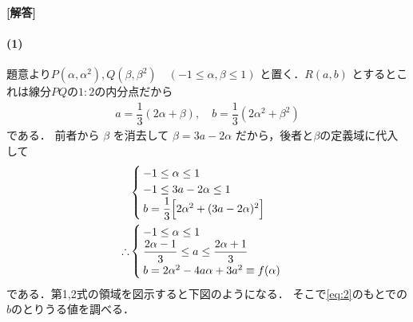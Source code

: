 \documentclass[../../main.tex]{subfiles}
\begin{document}
\begin{oframed}
  
\end{oframed}

{\bf [解答]}
\paragraph{(1)}

題意より$P(\alpha, \alpha^2), Q(\beta, \beta^2) \quad (-1 \le \alpha, \beta \le 1)$ と置く．$R(a, b)$ とするとこれは線分$PQ$の$1:2$の内分点だから
\begin{align}
  a = \dfrac{1}{3}(2\alpha + \beta), \quad b = \dfrac{1}{3}(2\alpha^2 + \beta^2) \label{eq:1}
\end{align}
である．
前者から $\beta$ を消去して $\beta = 3a - 2\alpha$ だから，後者と$\beta$の定義域に代入して
\begin{align}
  &
  \begin{cases}
    -1 \le \alpha \le 1 \\
    -1 \le 3a - 2\alpha \le 1 \\
    b = \dfrac{1}{3} \Bigl[ 2\alpha^2 + (3a - 2\alpha)^2 \Bigr]
  \end{cases} \\
  \therefore
  &
  \begin{cases}
    -1 \le \alpha \le 1 \\
    \dfrac{2\alpha-1}{3} \le a \le \dfrac{2\alpha + 1}{3} \\
    b = 2\alpha^2 - 4a\alpha + 3a^2 \equiv f(\alpha)
  \end{cases} \label{eq:2}
\end{align}
である．第1,2式の領域を図示すると下図のようになる．
そこで\cref{eq:2}のもとでの$b$のとりうる値を調べる．
\end{document}
